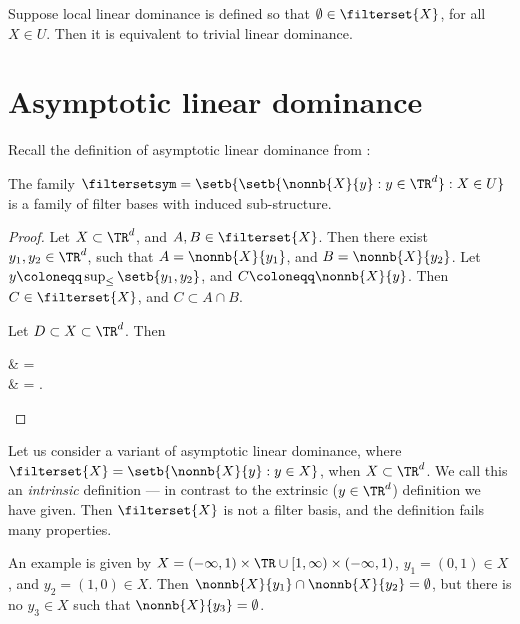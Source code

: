 \documentclass[b5paper, english, oneside]{memoir}
\begin{document}
\begin{note}
Suppose local linear dominance is defined so that $\emptyset \in \filterset{X}$, for all $X \in U$. Then it is equivalent to trivial linear dominance.
\end{note}

\section{Asymptotic linear dominance}
\label{AsymptoticLinearDominance}

Recall the definition of asymptotic linear dominance from :

\begin{theorem}
\label{AsymptoticLinearDominanceIsLocalLinearDominance}
The family $\filtersetsym = \setb{\setb{\nonnb{X}{y} : y \in \TR^d} : X \in U}$ is a family of filter bases with induced sub-structure.
\end{theorem}

\begin{proof}
Let $X \subset \TR^d$, and $A, B \in \filterset{X}$. Then there exist $y_1, y_2 \in \TR^d$, such that $A = \nonnb{X}{y_1}$, and $B = \nonnb{X}{y_2}$. Let $y \coloneqq \sup_{\leq}\setb{y_1, y_2}$, and $C \coloneqq \nonnb{X}{y}$. Then $C \in \filterset{X}$, and $C \subset A \cap B$. 

Let $D \subset X \subset \TR^d$. Then
\begin{eqs}
 & =  \\
{} & = .
\end{eqs}
\end{proof}

\begin{note}
\label{AsymptoticIntrinsicPitfall}
Let us consider a variant of asymptotic linear dominance, where $\filterset{X} = \setb{\nonnb{X}{y} : y \in X}$, when $X \subset \TR^d$. We call this an \emph{intrinsic} definition --- in contrast to the extrinsic ($y \in \TR^d$) definition we have given. Then $\filterset{X}$ is not a filter basis, and the definition fails many properties.

An example is given by $X = (-\infty, 1) \times \TR \cup [1, \infty) \times (-\infty, 1)$, $y_1 = (0, 1) \in X$, and $y_2 = (1, 0) \in X$. Then $\nonnb{X}{y_1} \cap \nonnb{X}{y_2} = \emptyset$, but there is no $y_3 \in X$ such that $\nonnb{X}{y_3} = \emptyset$.
\end{note}
\end{document}
